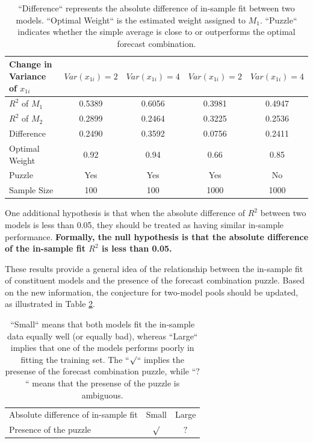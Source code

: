 \documentclass{monashthesis}
\begin{document}
\begin{table}[ht]
  \centering
    \begin{tabular}{l|cccc}
    \toprule
    Change in Variance of $x_{1i}$    &  $Var(x_{1i}) = 2$   &  $Var(x_{1i}) = 4$  &  $Var(x_{1i}) = 2$  &  $Var(x_{1i}) = 4$  \\
    \midrule
    $R^2$ of $M_1$  &    0.5389    &   0.6056   &    0.3981     &   0.4947   \\
    $R^2$ of $M_2$  &    0.2899    &   0.2464   &    0.3225     &   0.2536   \\
    Difference      &    0.2490    &   0.3592   &    0.0756     &   0.2411   \\
    Optimal Weight  &     0.92     &    0.94    &     0.66      &    0.85    \\
    Puzzle          &      Yes     &    Yes     &      Yes      &     No     \\
    Sample Size     &     100      &    100     &     1000      &    1000    \\
    \bottomrule
    \end{tabular}
  \caption{``Difference`` represents the absolute difference of in-sample fit between two models. ``Optimal Weight`` is the estimated weight assigned to $M_1$. ``Puzzle`` indicates whether the simple average is close to or outperforms the optimal forecast combination.}
  \label{tab:regvar}
\end{table}

One additional hypothesis is that when the absolute difference of \(R^2\) between two models is less than 0.05, they should be treated as having similar in-sample performance. \textbf{Formally, the null hypothesis is that the absolute difference of the in-sample fit \(R^2\) is less than 0.05.}

These results provide a general idea of the relationship between the in-sample fit of constituent models and the presence of the forecast combination puzzle. Based on the new information, the conjecture for two-model pools should be updated, as illustrated in Table \ref{tab:2}.

\begin{table}[ht]
\centering
\begin{tabular}{lcc}
Absolute difference of in-sample fit    &     Small      &    Large    \\
Presence of the puzzle                  &     $\surd$    &    $?$      \\
\end{tabular}
\caption{``Small`` means that both models fit the in-sample data equally well (or equally bad), whereas ``Large`` implies that one of the models performs poorly in fitting the training set. The ``$\surd$`` implies the presense of the forecast combination puzzle, while ``$?$`` means that the presense of the puzzle is ambiguous.}
\label{tab:2}
\end{table}
\end{document}
